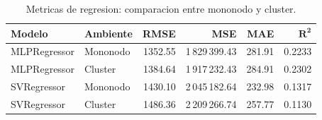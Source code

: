 \begin{table}[H]
    \centering
    \caption{Metricas de regresion: comparacion entre mononodo y cluster.}
    \label{tab:regression}
    \begin{tabular}{llrrrr}
        \toprule
        \textbf{Modelo} & \textbf{Ambiente} & \textbf{RMSE} & \textbf{MSE} & \textbf{MAE} & $\boldsymbol{R^2}$ \\
        \midrule
        MLPRegressor & Mononodo & 1352.55 & 1\,829\,399.43 & 281.91 & 0.2233 \\
        MLPRegressor & Cluster & 1384.64 & 1\,917\,232.43 & 284.91 & 0.2302 \\
        SVRegressor & Mononodo & 1430.10 & 2\,045\,182.64 & 232.98 & 0.1317 \\
        SVRegressor & Cluster & 1486.36 & 2\,209\,266.74 & 257.77 & 0.1130 \\
        \bottomrule
    \end{tabular}
\end{table}
